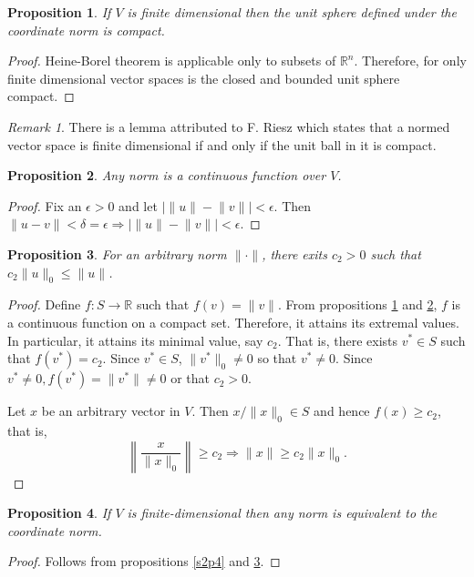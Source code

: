 \documentclass{article}
\theoremstyle{plain}
\numberwithin{thm}{section}
\theoremstyle{plain}
\newtheorem{prop}{Proposition}
\numberwithin{prop}{section}
\theoremstyle{definition}
\numberwithin{defn}{section}
\theoremstyle{remark}
\newtheorem*{rem}{Remark}
\numberwithin{equation}{section}
\begin{document}
\begin{prop}\label{s2p6}
If $V$ is finite dimensional then the unit sphere defined under the coordinate
norm is compact.
\end{prop}
\begin{proof}
Heine-Borel theorem is applicable only to subsets of $\mathbb{R}^n$. Therefore,
for only finite dimensional vector spaces is the closed and bounded unit sphere
compact.
\end{proof}
\begin{rem}
There is a lemma attributed to F. Riesz which states that a normed vector 
space is finite dimensional if and only if the unit ball in it is compact.
\end{rem}

\begin{prop}\label{s2p7}
Any norm is a continuous function over $V$.
\end{prop}
\begin{proof}
Fix an $\epsilon > 0$ and let $|\lVert u \rVert - \lVert v \rVert| < \epsilon$.
Then $\lVert u - v\rVert < \delta = \epsilon \Rightarrow |\lVert u \rVert - 
\lVert v \rVert| < \epsilon$.
\end{proof}

\begin{prop}\label{s2p8}
For an arbitrary norm $\lVert\cdot\rVert$, there exits $c_2 > 0$ such that
$c_2\lVert u \rVert_0 \le \lVert u \rVert$.
\end{prop}
\begin{proof}
Define $f: S \rightarrow \mathbb{R}$ such that $f(v) = \lVert v \rVert$. From
propositions \ref{s2p6} and \ref{s2p7}, $f$ is a continuous function on a 
compact set. Therefore, it attains its extremal values. In particular, it
attains its minimal value, say $c_2$. That is, there exists $v^\ast \in S$
such that $f(v^\ast) = c_2$. Since $v^\ast \in S$, $\lVert v^\ast \rVert_0 \ne
0$ so that $v^\ast \ne 0$. Since $v^\ast \ne 0, f(v^\ast) = \lVert v^\ast
\rVert \ne 0$ or that $c_2 > 0$.

Let $x$ be an arbitrary vector in $V$. Then $x/\lVert x \rVert_0 \in S$ and
hence $f(x) \ge c_2$, that is,
\[
\left\lVert \frac{x}{\lVert x \rVert_0} \right\rVert \ge c_2 \Rightarrow 
\lVert x \rVert \ge c_2 \lVert x \rVert_0.
\]
\end{proof}

\begin{prop}\label{s2p9}
If $V$ is finite-dimensional then any norm is equivalent to the coordinate
norm.
\end{prop}
\begin{proof}
Follows from propositions \ref{s2p4} and \ref{s2p8}.
\end{proof}
\end{document}
